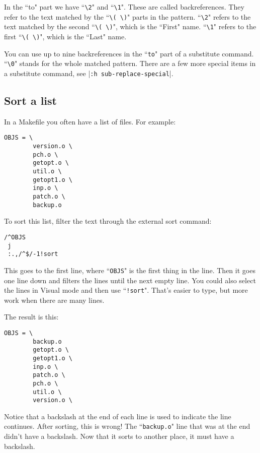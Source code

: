 In the ``to" part we have ``\texttt{\textbackslash{}2}" and ``\texttt{\textbackslash{}1}".
These are called backreferences.
They refer to the text matched by the ``\texttt{\textbackslash{}( \textbackslash{})}" parts in the pattern.
``\texttt{\textbackslash{}2}" refers to the text matched by the second ``\texttt{\textbackslash{}( \textbackslash{})}", which is the ``First" name.
``\texttt{\textbackslash{}1}" refers to the first ``\texttt{\textbackslash{}( \textbackslash{})}", which is the ``Last" name.

You can use up to nine backreferences in the ``\texttt{to}" part of a substitute command.
``\texttt{\textbackslash{}0}" stands for the whole matched pattern.
There are a few more special items in a substitute command, see |\texttt{:h sub-replace-special}|.
\subsection{Sort a list}

In a Makefile you often have a list of files.
For example:

\begin{Verbatim}[samepage=true]
    OBJS = \ 
        version.o \ 
        pch.o \ 
        getopt.o \ 
        util.o \ 
        getopt1.o \ 
        inp.o \ 
        patch.o \ 
        backup.o 
\end{Verbatim}

To sort this list, filter the text through the external sort command:

\begin{Verbatim}[samepage=true]
 /^OBJS
 j
 :.,/^$/-1!sort
\end{Verbatim}

This goes to the first line, where ``\texttt{OBJS}" is the first thing in the line.
Then it goes one line down and filters the lines until the next empty line.
You could also select the lines in Visual mode and then use ``\texttt{!sort}".
That's easier to type, but more work when there are many lines.

The result is this:

\begin{Verbatim}[samepage=true]
    OBJS = \ 
        backup.o 
        getopt.o \ 
        getopt1.o \ 
        inp.o \ 
        patch.o \ 
        pch.o \ 
        util.o \ 
        version.o \ 
\end{Verbatim}

Notice that a backslash at the end of each line is used to indicate the line continues.
After sorting, this is wrong!
The ``\texttt{backup.o}" line that was at the end didn't have a backslash.
Now that it sorts to another place, it must have a backslash.

